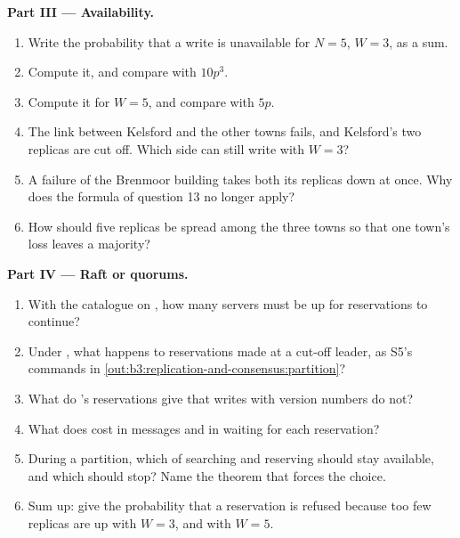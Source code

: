 \begin{problem}
\medskip\noindent\textbf{Part III --- Availability.}
\begin{enumerate}[resume]
  \item Write the probability that a write is unavailable for $N = 5$, $W = 3$, as a sum.
  \item Compute it, and compare with $10p^3$.
  \item Compute it for $W = 5$, and compare with $5p$.
  \item The link between Kelsford and the other towns fails, and Kelsford's two replicas are cut off. Which side can still write with $W = 3$?
  \item A failure of the Brenmoor building takes both its replicas down at once. Why does the formula of question 13 no longer apply?
  \item How should five replicas be spread among the three towns so that one town's loss leaves a majority?
\end{enumerate}

\medskip\noindent\textbf{Part IV --- Raft or quorums.}
\begin{enumerate}[resume]
  \item With the catalogue on , how many servers must be up for reservations to continue?
  \item Under , what happens to reservations made at a cut-off leader, as S5's commands in \cref{out:b3:replication-and-consensus:partition}?
  \item What do 's reservations give that  writes with version numbers do not?
  \item What does  cost in messages and in waiting for each reservation?
  \item During a partition, which of searching and reserving should stay available, and which should stop? Name the theorem that forces the choice.
  \item Sum up: give the probability that a reservation is refused because too few replicas are up with $W = 3$, and with $W = 5$.
\end{enumerate}
\end{problem}
